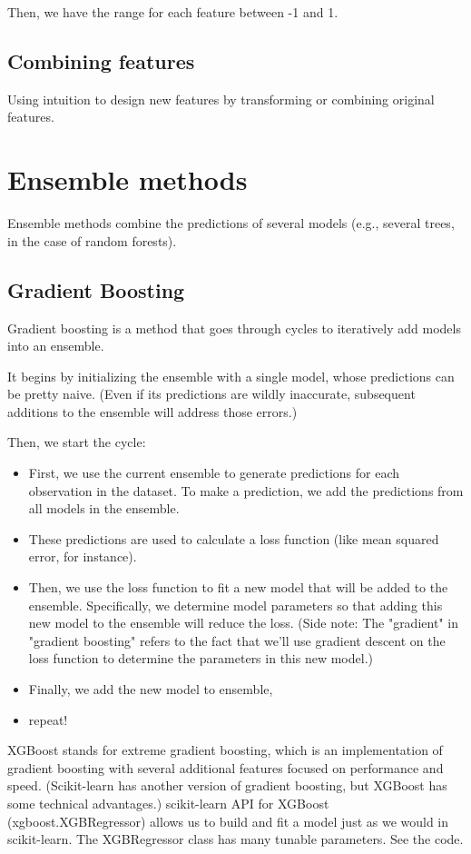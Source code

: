 \documentclass[12pt]{report}
\begin{document}
Then, we have the range for each feature between -1 and 1.

\subsection{Combining features}
Using intuition to design new features by transforming or combining original features.








\section{Ensemble methods}
Ensemble methods combine the predictions of several models (e.g., several trees, in the case of random forests).

\subsection{Gradient Boosting}
Gradient boosting is a method that goes through cycles to iteratively add models into an ensemble.

It begins by initializing the ensemble with a single model, whose predictions can be pretty naive. (Even if its predictions are wildly inaccurate, subsequent additions to the ensemble will address those errors.)

Then, we start the cycle:
\begin{itemize}
  \item First, we use the current ensemble to generate predictions for each observation in the dataset. To make a prediction, we add the predictions from all models in the ensemble.
  \item These predictions are used to calculate a loss function (like mean squared error, for instance).
  \item Then, we use the loss function to fit a new model that will be added to the ensemble. Specifically, we determine model parameters so that adding this new model to the ensemble will reduce the loss. (Side note: The "gradient" in "gradient boosting" refers to the fact that we'll use gradient descent on the loss function to determine the parameters in this new model.)
  \item Finally, we add the new model to ensemble,
  \item repeat!
\end{itemize}

XGBoost stands for extreme gradient boosting, which is an implementation of gradient boosting with several additional features focused on performance and speed. (Scikit-learn has another version of gradient boosting, but XGBoost has some technical advantages.) scikit-learn API for XGBoost (xgboost.XGBRegressor) allows us to build and fit a model just as we would in scikit-learn. The XGBRegressor class has many tunable parameters. See the code.
\end{document}
